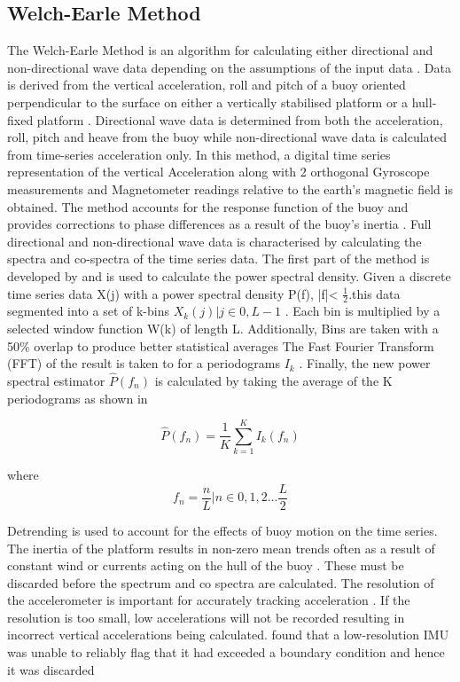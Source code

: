\subsection{Welch-Earle Method}
\label{welchearl}
The Welch-Earle Method is an algorithm for calculating either directional and non-directional wave data depending on the assumptions of the input data \cite{earle1996nondirectional}. Data is derived from the vertical acceleration, roll and pitch of a buoy oriented perpendicular to the surface on either a vertically stabilised platform or a hull-fixed platform \cite{earle1996nondirectional}. Directional wave data is determined from both the acceleration, roll, pitch and heave from the buoy while non-directional wave data is calculated from time-series acceleration only. In this method, a digital time series representation of the vertical Acceleration along with 2 orthogonal Gyroscope measurements and Magnetometer readings relative to the earth’s magnetic field is obtained. The method accounts for the response function of the buoy and provides corrections to phase differences as a result of the buoy's inertia \cite{earle1996nondirectional}. Full directional and non-directional wave data is characterised by calculating the spectra and co-spectra of the time series data. The first part of the method is developed by \textcite{welch1967use} and is used to calculate the power spectral density.
Given a discrete time series data X(j) with a power spectral density P(f), |f|< $\frac{1}{2}$.this data segmented into a set of k-bins $X_k(j) | j \in {0,L-1}$ \cite{welch1967use}. Each bin is multiplied by a selected window function W(k) of length L. Additionally, Bins are taken with a 50\% overlap to produce better statistical averages \cite{earle1996nondirectional} The Fast Fourier Transform (FFT) of the result is taken to for a periodograms $I_k$ \cite{earle1996nondirectional}. Finally, the new power spectral estimator $\hat{P}(f_n)$ is calculated by taking the average of the K periodograms as shown in \textcite{welch1967use}

\begin{equation}
	\hat{P}(f_n) = \frac{1}{K}\sum^K_{k=1}I_k(f_n)
\end{equation}

where 
\begin{equation}
	f_n = \frac{n}{L} | n \in 0,1,2... \frac{L}{2}
\end{equation}

Detrending is used to account for the effects of buoy motion on the time series. The inertia of the platform results in non-zero mean trends often as a result of constant wind or currents acting on the hull of the buoy \cite{earle1996nondirectional}. These must be discarded before the spectrum and co spectra are calculated. The resolution of the accelerometer is important for accurately tracking acceleration \cite{kohout2015device}. If the resolution is too small, low accelerations will not be recorded resulting in incorrect vertical accelerations being calculated. \textcite{kohout2015device} found that a low-resolution IMU was unable to reliably flag that it had exceeded a boundary condition and hence it was discarded \cite{kohout2015device}\par 

